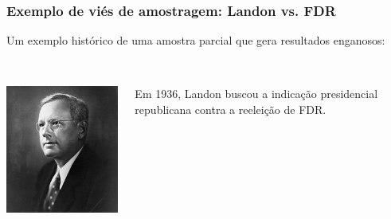 \begin{frame}
\frametitle{Exemplo de viés de amostragem: Landon vs. FDR}
\justifying
Um exemplo histórico de uma amostra parcial que gera resultados enganosos: \\

$\:$ \\

\begin{columns}[c]


\includegraphics[width= \textwidth]{1-3_data_collection_principles/figures/landon_fdr/landon.png}

\justifying
Em 1936, Landon buscou a indicação presidencial republicana contra a reeleição de FDR.



\end{columns}
\end{frame}
